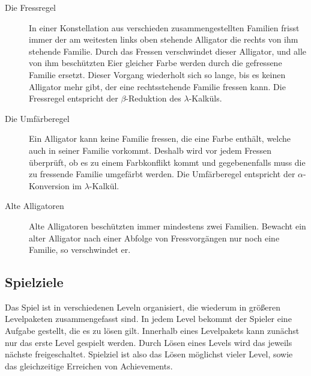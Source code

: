 	\begin{description}

		\item[Die Fressregel] In einer Konstellation aus verschieden zusammengestellten Familien frisst immer der am weitesten links oben stehende Alligator die rechts von ihm stehende Familie.
		Durch das Fressen verschwindet dieser Alligator, und alle von ihm beschützten Eier gleicher Farbe werden durch die gefressene Familie ersetzt.
		Dieser Vorgang wiederholt sich so lange, bis es keinen Alligator mehr gibt, der eine rechtsstehende Familie fressen kann.
		Die Fressregel entspricht der \(\beta\)-Reduktion des \(\lambda\)-Kalküls.

		\item[Die Umfärberegel] Ein Alligator kann keine Familie fressen, die eine Farbe enthält, welche auch in seiner Familie vorkommt.
		Deshalb wird vor jedem Fressen überprüft, ob es zu einem Farbkonflikt kommt und gegebenenfalls muss die zu fressende Familie umgefärbt werden.
		Die Umfärberegel entspricht der \(\alpha\)-Konversion im \(\lambda\)-Kalkül.

		\item[Alte Alligatoren] Alte Alligatoren beschützten immer mindestens zwei Familien.
		Bewacht ein alter Alligator nach einer Abfolge von Fressvorgängen nur noch eine Familie, so verschwindet er.

	\end{description}

\subsection{Spielziele}

Das Spiel ist in verschiedenen Leveln organisiert, die wiederum in größeren Levelpaketen zusammengefasst sind.
In jedem Level bekommt der Spieler eine Aufgabe gestellt, die es zu lösen gilt.
Innerhalb eines Levelpakets kann zunächst nur das erste Level gespielt werden.
Durch Lösen eines Levels wird das jeweils nächste freigeschaltet.
Spielziel ist also das Lösen möglichst vieler Level, sowie das gleichzeitige Erreichen von Achievements.

